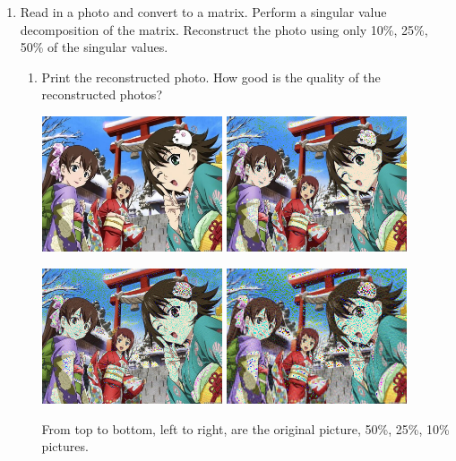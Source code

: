 \documentclass[a4paper, 12pt]{mcshw}
\begin{document}
\begin{enumerate}
    \item Read in a photo and convert to a matrix. Perform a singular value decomposition of the matrix. Reconstruct the photo using only 10\%, 25\%, 50\% of the singular values.
        \begin{enumerate}
            \item Print the reconstructed photo. How good is the quality of the reconstructed photos?
                \begin{center}
                    \vspace{3mm}
                    \includegraphics[height=4cm]{a.bmp}
                    \includegraphics[height=4cm]{50.bmp}

                    \includegraphics[height=4cm]{25.bmp}
                    \includegraphics[height=4cm]{10.bmp}
                    \vspace{3mm}
                \end{center}
                From top to bottom, left to right, are the original picture, 50\%, 25\%, 10\% pictures.


\end{enumerate}
\end{enumerate}
\end{document}
